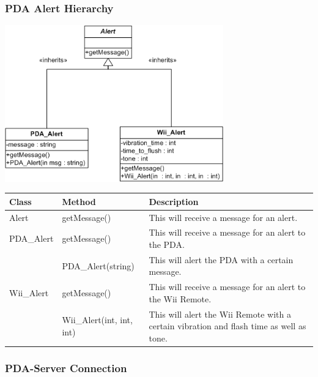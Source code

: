 \documentclass{article}
\begin{document}
\subsubsection{PDA Alert Hierarchy}

\begin{center}
\includegraphics[width=3.72in,height=2.66in]{PDA_Alert_Hierarchy.png}
\end{center}


\begin{longtable}[t]{|p{1.5in}|p{2in}|p{2.5in}|}

\hline
\textbf{Class} & \textbf{Method} & \textbf{Description} \\
\hline

Alert
	& getMessage() & This will receive a message for an alert. \\
\hline %

PDA\_Alert
	& getMessage() & This will receive a message for an alert to the PDA. \\
\cline{2-3}
      & PDA\_Alert(string) & This will alert the PDA with a certain message. \\
\hline %

Wii\_Alert
	& getMessage() & This will receive a message for an alert to the Wii Remote. \\
\cline{2-3}
      & Wii\_Alert(int, int, int) & This will alert the Wii Remote with a certain vibration and flash time as well as tone. \\
\hline %
\end{longtable}


\subsubsection{PDA-Server Connection}
\end{document}

